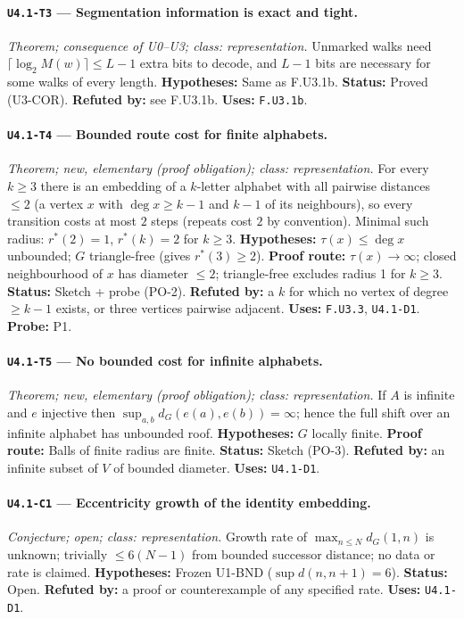 \documentclass[11pt]{article}
\begin{document}
\paragraph{\texttt{U4.1-T3} --- Segmentation information is exact and tight.} \emph{Theorem; consequence of U0--U3; class: representation.} Unmarked walks need $\lceil\log_2M(w)\rceil\le L-1$ extra bits to decode, and $L-1$ bits are necessary for some walks of every length. \textbf{Hypotheses:} Same as F.U3.1b. \textbf{Status:} Proved (U3-COR). \textbf{Refuted by:} see F.U3.1b. \textbf{Uses:} \texttt{F.U3.1b}.

\paragraph{\texttt{U4.1-T4} --- Bounded route cost for finite alphabets.} \emph{Theorem; new, elementary (proof obligation); class: representation.} For every $k\ge3$ there is an embedding of a $k$-letter alphabet with all pairwise distances $\le2$ (a vertex $x$ with $\deg x\ge k-1$ and $k-1$ of its neighbours), so every transition costs at most $2$ steps (repeats cost $2$ by convention). Minimal such radius: $r^*(2)=1$, $r^*(k)=2$ for $k\ge3$. \textbf{Hypotheses:} $\tau(x)\le\deg x$ unbounded; $G$ triangle-free (gives $r^*(3)\ge2$). \textbf{Proof route:} $\tau(x)\to\infty$; closed neighbourhood of $x$ has diameter $\le2$; triangle-free excludes radius 1 for $k\ge3$. \textbf{Status:} Sketch + probe (PO-2). \textbf{Refuted by:} a $k$ for which no vertex of degree $\ge k-1$ exists, or three vertices pairwise adjacent. \textbf{Uses:} \texttt{F.U3.3}, \texttt{U4.1-D1}. \textbf{Probe:} P1.

\paragraph{\texttt{U4.1-T5} --- No bounded cost for infinite alphabets.} \emph{Theorem; new, elementary (proof obligation); class: representation.} If $A$ is infinite and $e$ injective then $\sup_{a,b}d_G(e(a),e(b))=\infty$; hence the full shift over an infinite alphabet has unbounded roof. \textbf{Hypotheses:} $G$ locally finite. \textbf{Proof route:} Balls of finite radius are finite. \textbf{Status:} Sketch (PO-3). \textbf{Refuted by:} an infinite subset of $V$ of bounded diameter. \textbf{Uses:} \texttt{U4.1-D1}.

\paragraph{\texttt{U4.1-C1} --- Eccentricity growth of the identity embedding.} \emph{Conjecture; open; class: representation.} Growth rate of $\max_{n\le N}d_G(1,n)$ is unknown; trivially $\le6(N-1)$ from bounded successor distance; no data or rate is claimed. \textbf{Hypotheses:} Frozen U1-BND ($\sup d(n,n+1)=6$). \textbf{Status:} Open. \textbf{Refuted by:} a proof or counterexample of any specified rate. \textbf{Uses:} \texttt{U4.1-D1}.
\end{document}
